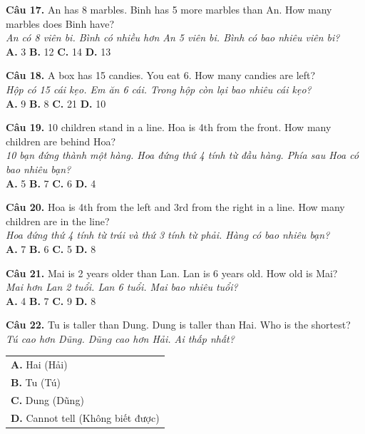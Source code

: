 \documentclass[11pt,a4paper]{article}
\begin{document}
\textbf{Câu 17.} An has 8 marbles. Binh has 5 more marbles than An. How many marbles does Binh have?\\
\textit{An có 8 viên bi. Bình có nhiều hơn An 5 viên bi. Bình có bao nhiêu viên bi?}\\
\textbf{A.} 3 \quad \textbf{B.} 12 \quad \textbf{C.} 14 \quad \textbf{D.} 13\par\vspace{1.2mm}

\textbf{Câu 18.} A box has 15 candies. You eat 6. How many candies are left?\\
\textit{Hộp có 15 cái kẹo. Em ăn 6 cái. Trong hộp còn lại bao nhiêu cái kẹo?}\\
\textbf{A.} 9 \quad \textbf{B.} 8 \quad \textbf{C.} 21 \quad \textbf{D.} 10\par\vspace{1.2mm}

\textbf{Câu 19.} 10 children stand in a line. Hoa is 4th from the front. How many children are behind Hoa?\\
\textit{10 bạn đứng thành một hàng. Hoa đứng thứ 4 tính từ đầu hàng. Phía sau Hoa có bao nhiêu bạn?}\\
\textbf{A.} 5 \quad \textbf{B.} 7 \quad \textbf{C.} 6 \quad \textbf{D.} 4\par\vspace{1.2mm}

\textbf{Câu 20.} Hoa is 4th from the left and 3rd from the right in a line. How many children are in the line?\\
\textit{Hoa đứng thứ 4 tính từ trái và thứ 3 tính từ phải. Hàng có bao nhiêu bạn?}\\
\textbf{A.} 7 \quad \textbf{B.} 6 \quad \textbf{C.} 5 \quad \textbf{D.} 8\par\vspace{1.2mm}

\textbf{Câu 21.} Mai is 2 years older than Lan. Lan is 6 years old. How old is Mai?\\
\textit{Mai hơn Lan 2 tuổi. Lan 6 tuổi. Mai bao nhiêu tuổi?}\\
\textbf{A.} 4 \quad \textbf{B.} 7 \quad \textbf{C.} 9 \quad \textbf{D.} 8\par\vspace{1.2mm}

\textbf{Câu 22.} Tu is taller than Dung. Dung is taller than Hai. Who is the shortest?\\
\textit{Tú cao hơn Dũng. Dũng cao hơn Hải. Ai thấp nhất?}\\
\begin{tabular}{@{}l@{}}
\textbf{A.} Hai (Hải)\\
\textbf{B.} Tu (Tú)\\
\textbf{C.} Dung (Dũng)\\
\textbf{D.} Cannot tell (Không biết được)
\end{tabular}\par\vspace{1.2mm}
\end{document}
